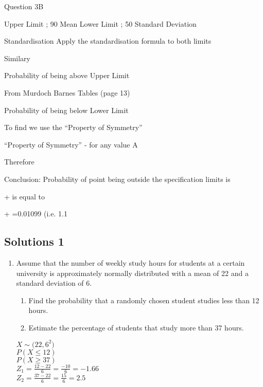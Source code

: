 \documentclass[]{report}
\begin{document}
Question 3B

Upper Limit ; 90		Mean		 	
Lower Limit ; 50		Standard Deviation	 

Standardisation
Apply the standardisation formula	 	to both limits


Similary



Probability of being above Upper Limit

From Murdoch Barnes Tables (page 13)  

Probability of being below Lower Limit


To find   we use the “Property of Symmetry”

“Property of Symmetry” -   for any value A

Therefore 

Conclusion: 
Probability of point being outside the specification limits is

+ is equal to

+ =0.01099  	(i.e. 1.1%







\subsection{Solutions 1}

\begin{enumerate}
	
	\item Assume that the number of weekly study hours for students at a certain university
	is approximately normally distributed with a mean of 22 and a standard deviation
	of 6.
	\begin{enumerate}
		\item Find the probability that a randomly chosen student studies less than 12
		hours.
		\item Estimate the percentage of students that study more than 37 hours.
	\end{enumerate}
	
	
	$X \sim \mathcal(22,6^2)$\\
	$P(X \leq 12)$\\
	$P(X \geq 37)$\\
	$Z_1 = \frac{12 - 22}{6} = \frac{-10}{6} = -1.66 $\\
	$Z_2 = \frac{37 - 22}{6} = \frac{15}{6} = 2.5 $
	
	
\end{enumerate}
\end{document}
